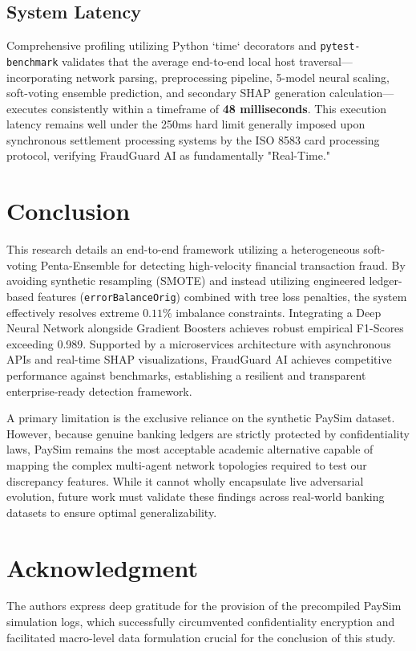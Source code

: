 \documentclass[conference]{IEEEtran}
\begin{document}
\subsection{System Latency}
Comprehensive profiling utilizing Python `time` decorators and \texttt{pytest-benchmark} validates that the average end-to-end local host traversal—incorporating network parsing, preprocessing pipeline, 5-model neural scaling, soft-voting ensemble prediction, and secondary SHAP generation calculation—executes consistently within a timeframe of \textbf{48 milliseconds}. This execution latency remains well under the 250ms hard limit generally imposed upon synchronous settlement processing systems by the ISO 8583 card processing protocol, verifying FraudGuard AI as fundamentally "Real-Time."

\section{Conclusion}
\label{sec:conclusion}
This research details an end-to-end framework utilizing a heterogeneous soft-voting Penta-Ensemble for detecting high-velocity financial transaction fraud. By avoiding synthetic resampling (SMOTE) and instead utilizing engineered ledger-based features (\texttt{errorBalanceOrig}) combined with tree loss penalties, the system effectively resolves extreme $0.11\%$ imbalance constraints. Integrating a Deep Neural Network alongside Gradient Boosters achieves robust empirical F1-Scores exceeding 0.989. Supported by a microservices architecture with asynchronous APIs and real-time SHAP visualizations, FraudGuard AI achieves competitive performance against benchmarks, establishing a resilient and transparent enterprise-ready detection framework.

A primary limitation is the exclusive reliance on the synthetic PaySim dataset. However, because genuine banking ledgers are strictly protected by confidentiality laws, PaySim remains the most acceptable academic alternative capable of mapping the complex multi-agent network topologies required to test our discrepancy features. While it cannot wholly encapsulate live adversarial evolution, future work must validate these findings across real-world banking datasets to ensure optimal generalizability.

\section*{Acknowledgment}
The authors express deep gratitude for the provision of the precompiled PaySim simulation logs, which successfully circumvented confidentiality encryption and facilitated macro-level data formulation crucial for the conclusion of this study.
\end{document}
